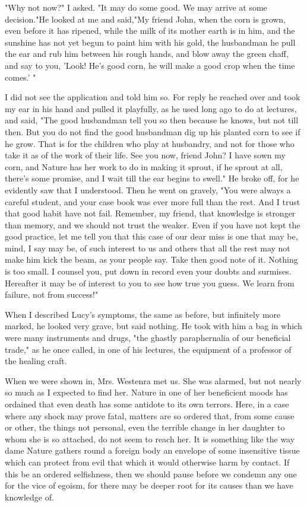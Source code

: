 "Why not now?" I asked. "It may do some good. We may arrive at some decision."He looked at me and said,"My friend John, when the corn is grown, even before it has ripened, while the milk of its mother earth is in him, and the sunshine has not yet begun to paint him with his gold, the husbandman he pull the ear and rub him between his rough hands, and blow away the green chaff, and say to you, 'Look! He's good corn, he will make a good crop when the time comes.' " 

I did not see the application and told him so. For reply he reached over and took my ear in his hand and pulled it playfully, as he used long ago to do at lectures, and said, "The good husbandman tell you so then because he knows, but not till then. But you do not find the good husbandman dig up his planted corn to see if he grow. That is for the children who play at husbandry, and not for those who take it as of the work of their life. See you now, friend John? I have sown my corn, and Nature has her work to do in making it sprout, if he sprout at all, there's some promise, and I wait till the ear begins to swell." He broke off, for he evidently saw that I understood. Then he went on gravely, "You were always a careful student, and your case book was ever more full than the rest. And I trust that good habit have not fail. Remember, my friend, that knowledge is stronger than memory, and we should not trust the weaker. Even if you have not kept the good practice, let me tell you that this case of our dear miss is one that may be, mind, I say may be, of such interest to us and others that all the rest may not make him kick the beam, as your people say. Take then good note of it. Nothing is too small. I counsel you, put down in record even your doubts and surmises. Hereafter it may be of interest to you to see how true you guess. We learn from failure, not from success!" 

When I described Lucy's symptoms, the same as before, but infinitely more marked, he looked very grave, but said nothing. He took with him a bag in which were many instruments and drugs, "the ghastly paraphernalia of our beneficial trade," as he once called, in one of his lectures, the equipment of a professor of the healing craft. 

When we were shown in, Mrs. Westenra met us. She was alarmed, but not nearly so much as I expected to find her. Nature in one of her beneficient moods has ordained that even death has some antidote to its own terrors. Here, in a case where any shock may prove fatal, matters are so ordered that, from some cause or other, the things not personal, even the terrible change in her daughter to whom she is so attached, do not seem to reach her. It is something like the way dame Nature gathers round a foreign body an envelope of some insensitive tissue which can protect from evil that which it would otherwise harm by contact. If this be an ordered selfishness, then we should pause before we condemn any one for the vice of egoism, for there may be deeper root for its causes than we have knowledge of. 

